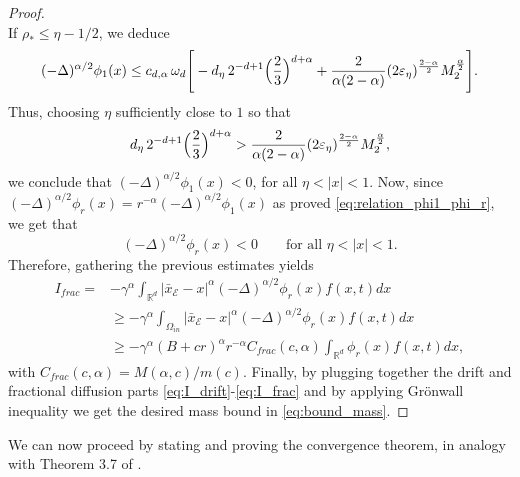 \documentclass[11pt,handout]{article}%
\numberwithin{equation}{section}
\theoremstyle{definition}
\def\RR{\mathbb R}
\begin{document}
\begin{proof}
\[	\]
	If $\rho_*\le \eta-1/2$, we deduce
	\begin{equation*}
		(-\Delta)^{\alpha/2}\phi_1(x)
		\le c_{d,\alpha}\,\omega_d\Bigg[
		- d_\eta\,2^{-d+1}\Bigl(\frac{2}{3}\Bigr)^{d+\alpha}
		+ \frac{2}{\alpha(2-\alpha)}(2\varepsilon_\eta)^{\frac{2-\alpha}{2}} M_2^{\frac{\alpha}{2}}
		\Bigg].
	\end{equation*}
	Thus, choosing $\eta$ sufficiently close to $1$ so that
	\begin{equation*}
		d_\eta\,2^{-d+1}\Bigl(\frac{2}{3}\Bigr)^{d+\alpha}
		>
		\frac{2}{\alpha(2-\alpha)}(2\varepsilon_\eta)^{\frac{2-\alpha}{2}} M_2^{\frac{\alpha}{2}},
	\end{equation*}
	we conclude that
	$(-\Delta)^{\alpha/2}\phi_1(x)<0$, for all  $\eta<|x|<1.
	$ 
	Now, since $(-\Delta)^{\alpha/2}\phi_r(x) = r^{-\alpha} (-\Delta)^{\alpha/2}\phi_1(x)$ as proved \eqref{eq:relation_phi1_phi_r}, we get that 
	\[
	(-\Delta)^{\alpha/2}\phi_r(x)<0 \qquad \text{for all } \eta<|x|<1.
	\]
	Therefore, gathering the previous estimates yields
	\begin{equation}\label{eq:I_frac}
		\begin{split}
			I_{frac} = &-\gamma^\alpha \int_{\RR^d} \vert \bar{x}_\mathcal{E} -x \vert^\alpha   (-\Delta)^{\alpha/2} \phi_r(x) f(x,t) dx \\
			& \geq -\gamma^\alpha \int_{\Omega_{in}} \vert \bar{x}_\mathcal{E} -x \vert^\alpha   (-\Delta)^{\alpha/2} \phi_r(x) f(x,t) dx \\
			& \geq -\gamma^\alpha (B+cr)^\alpha r^{-\alpha} C_{frac}(c,\alpha)  \int_{\RR^d} \phi_r(x) f(x,t) dx,%
		\end{split}
	\end{equation}
	with $C_{frac}(c,\alpha) =  M(\alpha,c)/m(c)$.
	Finally, by plugging together the drift and fractional diffusion parts \eqref{eq:I_drift}-\eqref{eq:I_frac} and by applying Gr{\"o}nwall inequality we get the desired mass bound in \eqref{eq:bound_mass}. 
\end{proof}
We can now proceed by stating and proving the convergence theorem, in analogy with Theorem 3.7 of \cite{fornasier2024consensus}. 
\end{document}
